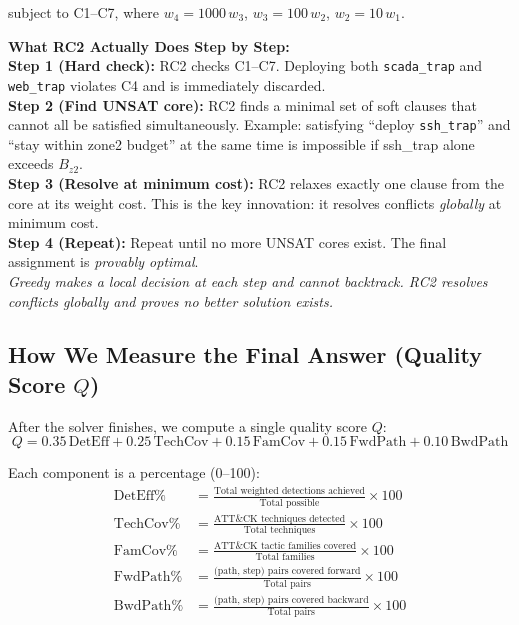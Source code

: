 \documentclass[journal]{IEEEtran}
\begin{document}
subject to C1--C7, where
$w_4 = 1000\,w_3$, $w_3 = 100\,w_2$, $w_2 = 10\,w_1$.

\begin{examplebox}
\textbf{What RC2 Actually Does Step by Step:}\\[3pt]
\textbf{Step 1 (Hard check):} RC2 checks C1--C7.
Deploying both \texttt{scada\_trap} and \texttt{web\_trap}
violates C4 and is immediately discarded.\\
\textbf{Step 2 (Find UNSAT core):} RC2 finds a minimal set
of soft clauses that cannot all be satisfied simultaneously.
Example: satisfying ``deploy \texttt{ssh\_trap}'' and
``stay within zone2 budget'' at the same time is impossible
if ssh\_trap alone exceeds $B_{z2}$.\\
\textbf{Step 3 (Resolve at minimum cost):} RC2 relaxes
exactly one clause from the core at its weight cost.
This is the key innovation: it resolves conflicts
\emph{globally} at minimum cost.\\
\textbf{Step 4 (Repeat):} Repeat until no more UNSAT
cores exist.
The final assignment is \emph{provably optimal}.\\[3pt]
\textit{Greedy makes a local decision at each step and cannot
backtrack.
RC2 resolves conflicts globally and proves no better solution
exists.}
\end{examplebox}

\subsection{How We Measure the Final Answer (Quality Score
$Q$)}

After the solver finishes, we compute a single quality
score $Q$:
\begin{equation}
  Q = 0.35\,\text{DetEff} + 0.25\,\text{TechCov}
    + 0.15\,\text{FamCov} + 0.15\,\text{FwdPath}
    + 0.10\,\text{BwdPath}
\end{equation}

Each component is a percentage (0--100):
\begin{align}
  \text{DetEff}\%  &=
    \frac{\text{Total weighted detections achieved}}
         {\text{Total possible}} \times 100 \\[3pt]
  \text{TechCov}\% &=
    \frac{\text{ATT\&CK techniques detected}}
         {\text{Total techniques}} \times 100 \\[3pt]
  \text{FamCov}\%  &=
    \frac{\text{ATT\&CK tactic families covered}}
         {\text{Total families}} \times 100 \\[3pt]
  \text{FwdPath}\% &=
    \frac{\text{(path, step) pairs covered forward}}
         {\text{Total pairs}} \times 100 \\[3pt]
  \text{BwdPath}\% &=
    \frac{\text{(path, step) pairs covered backward}}
         {\text{Total pairs}} \times 100
\end{align}
\end{document}
